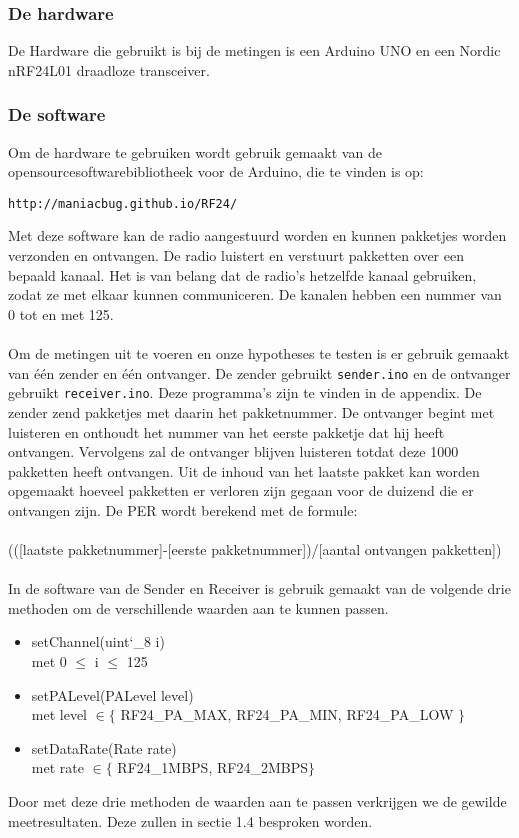 \documentclass{article}
\begin{document}
\subsubsection{De hardware}
De Hardware die gebruikt is bij de metingen is een Arduino UNO en een Nordic nRF24L01 draadloze transceiver.\\

\subsubsection{De software}
Om de hardware te gebruiken wordt gebruik gemaakt van de opensourcesoftwarebibliotheek voor de Arduino, die te vinden is op: \begin{verbatim}http://maniacbug.github.io/RF24/ \end{verbatim} 
Met deze software kan de radio aangestuurd worden en kunnen pakketjes worden verzonden en ontvangen. De radio luistert en verstuurt pakketten over een bepaald kanaal. Het is van belang dat de radio's hetzelfde kanaal gebruiken, zodat ze met elkaar kunnen communiceren. De kanalen hebben een nummer van 0 tot en met 125.\\
\\
Om de metingen uit te voeren en onze hypotheses te testen is er gebruik gemaakt van \'{e}\'{e}n zender en \'{e}\'{e}n ontvanger. De zender gebruikt \texttt{sender.ino} en de ontvanger gebruikt \texttt{receiver.ino}. Deze programma's zijn te vinden in de appendix. De zender zend pakketjes met daarin het pakketnummer. De ontvanger begint met luisteren en onthoudt het nummer van het eerste pakketje dat hij heeft ontvangen. Vervolgens zal de ontvanger blijven luisteren totdat deze 1000 pakketten heeft ontvangen. Uit de inhoud van het laatste pakket kan worden opgemaakt hoeveel pakketten er verloren zijn gegaan voor de duizend die er ontvangen zijn. De PER wordt berekend met de formule:\\
\\
\indent	(([laatste pakketnummer]-[eerste pakketnummer])/[aantal ontvangen pakketten])\\
\\
In de software van de Sender en Receiver is gebruik gemaakt van de volgende drie methoden om de verschillende waarden aan te kunnen passen. 
\begin{itemize}
	\item setChannel(uint\char`_8 i) \\
	met 0 $\leq$ i $\leq$ 125
	\item setPALevel(PALevel level) \\
	met level $\in \{$  RF24\_PA\_MAX, RF24\_PA\_MIN, RF24\_PA\_LOW $\}$
	\item setDataRate(Rate rate) \\
	met rate $\in \{$ RF24\_1MBPS, RF24\_2MBPS$\}$
\end{itemize}
Door met deze drie methoden de waarden aan te passen verkrijgen we de gewilde meetresultaten. Deze zullen in sectie 1.4 besproken worden.
\end{document}
